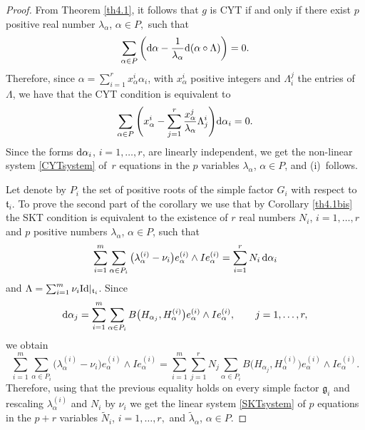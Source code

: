 \documentclass[10pt,a4paper]{amsart}
\numberwithin{equation}{section}
\begin{document}
\begin{proof}
From Theorem \ref{th4.1}, it follows that $g$ is CYT if and only if there exist $p$ positive real number $\lambda_{\alpha}$, $\alpha \in P,$ such that
\[
\sum_{\alpha \in P}  \bigg ({\rm d}\alpha - \frac{1}{\lambda_{\alpha} } {\rm d}( \alpha \circ \Lambda ) \bigg) =0.
\]
Therefore, since $\alpha =\sum_{i = 1}^r x_\alpha^i \alpha_i$, with $x_\alpha^i$ positive integers and $\Lambda_i^j$ the entries of $\Lambda$,
 we have that the CYT condition is equivalent to
\[
\sum_{\alpha \in P} \Bigg( x_\alpha^i - \sum_{j=1}^r \frac{x_\alpha^j}{\lambda_{\alpha}} \Lambda^i_j \Bigg) {\rm d}\alpha_i = 0.
\]
Since the forms ${\rm d} \alpha_i$, $i= 1, \dots, r$, are linearly independent, we get the non-linear system \eqref{CYTsystem} of~$r$ equations in the $p$ variables $\lambda_{\alpha}$, $\alpha \in P$, and (i)~follows.

Let denote by $P_i$ the set of positive roots of the simple factor $G_i$ with respect to $\mathfrak t_i$.
To prove the second part of the corollary we use that by Corollary \ref{th4.1bis} the SKT condition is equivalent to the existence of $r$ real numbers $N_i$, $i = 1, \dots, r$ and $p$ positive numbers $\lambda_{\alpha}$, $\alpha \in P$, such that
\[
\sum_{i = 1}^m \sum_{\alpha \in P_i} \big(\lambda_{\alpha}^{(i)} - \nu_i\big) e_{\alpha}^{(i)} \wedge I e_{\alpha}^{(i)} = \sum_{i = 1}^r N_i \, {\rm d}\alpha_i
\]
and $\Lambda = \sum_{i =1}^m \nu_i {\rm Id} |_{\mathfrak t_i}$.
Since
\[
{\rm d}\alpha_j= \sum_{i = 1}^m \sum_{\alpha \in P_i} B\big(H_{\alpha_j}, H_{\alpha}^{(i)}\big) e_{\alpha} ^{(i)} \wedge I e_{\alpha}^{(i)}, \qquad j =1, \dots, r,
\]
we obtain
\[
\sum_{i =1}^m \sum_{\alpha \in P_i} \big(\lambda_{\alpha}^{(i)} - \nu_i\big) e_{\alpha}^{(i)} \wedge I e_{\alpha} ^{(i)}= \sum_{i =1}^m \sum_{j = 1}^r N_j \sum_{\alpha \in P_i} B\big(H_{\alpha_j}, H_{\alpha}^{(i)}\big) e_{\alpha}^{(i)} \wedge I e_{\alpha}^{(i)}.
\]
Therefore, using that the previous equality holds on every simple factor $\mathfrak g_i$ and rescaling $\lambda_{\alpha}^{(i)}$ and $N_i$ by $\nu_i$ we get the linear system \eqref{SKTsystem} of $p$ equations in the $p + r$ variables $\tilde N_i$, $i = 1, \dots, r,$ and $ \tilde \lambda_{\alpha}$, $\alpha \in P.$


\end{proof}
\end{document}
